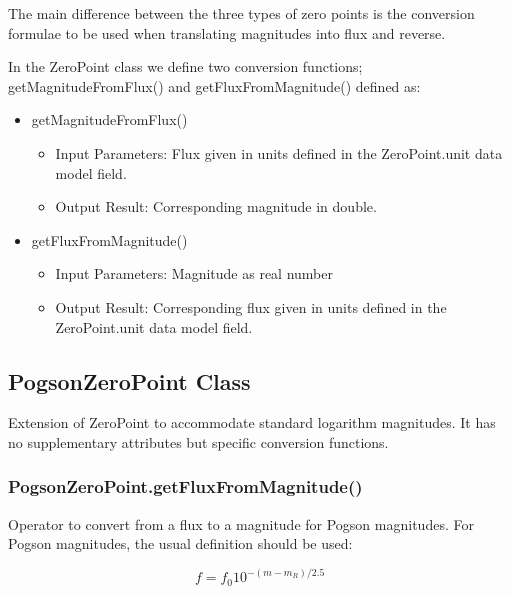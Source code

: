 \documentclass[11pt,a4paper]{ivoa}
\begin{document}

The main difference between the three types of zero points is the
conversion formulae to be used when translating magnitudes into flux and
reverse.\par

In the ZeroPoint class we define two conversion functions;
getMagnitudeFromFlux() and getFluxFromMagnitude() defined as:\par

\begin{itemize}
	\item getMagnitudeFromFlux()\par

\begin{itemize}
	\item{Input Parameters: Flux given in units defined in the
	ZeroPoint.unit data model field.\par}

	\item{Output Result: Corresponding magnitude in double.\par}


\vspace{\baselineskip}

\end{itemize}
	\item  getFluxFromMagnitude()\par

\begin{itemize}
	\item{Input Parameters: Magnitude as real number\par}

	\item{Output Result: Corresponding flux given in units defined in
	the ZeroPoint.unit data model field.}
\end{itemize}
\end{itemize}
\par


\subsection{PogsonZeroPoint Class}
Extension of ZeroPoint to accommodate standard logarithm magnitudes. It
has no supplementary attributes but specific conversion functions.
\par

\subsubsection{PogsonZeroPoint.getFluxFromMagnitude()}
Operator to convert from a flux to a magnitude for Pogson magnitudes. For
Pogson magnitudes, the usual definition should be used:
\par
\begin{equation} \label{eq:25}
f = f_0 10^{-(m-m_R)/2.5}
\end{equation}
\end{document}
